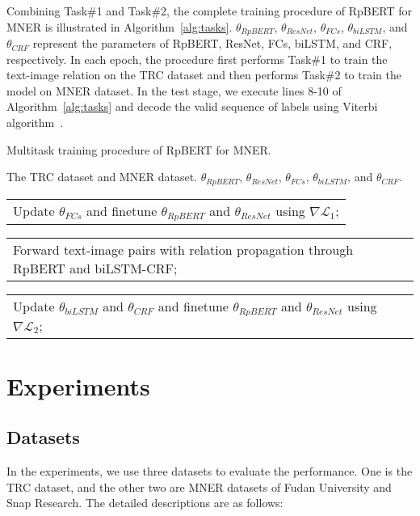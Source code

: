 \documentclass[letterpaper]{article} \usepackage{aaai21}  \usepackage{times}  \usepackage{helvet} \usepackage{courier}  \usepackage[hyphens]{url}  \usepackage{graphicx} \urlstyle{rm} \def\UrlFont{\rm}  \usepackage{natbib}  \usepackage{caption} \frenchspacing  \setlength{\pdfpagewidth}{8.5in}  \setlength{\pdfpageheight}{11in}
\makeatletter
\newcommand{\multiline}[1]{\begin{tabularx}{\dimexpr\linewidth-\ALG@thistlm}[t]{@{}X@{}}
    #1
  \end{tabularx}
}
\makeatother
\begin{document}
\smallskip

Combining Task\#1 and Task\#2, the complete training procedure of RpBERT for MNER is illustrated in Algorithm~\ref{alg:tasks}. 
$\theta_{RpBERT}$, $\theta_{ResNet}$, $\theta_{FCs}$, $\theta_{biLSTM}$, and $\theta_{CRF}$ represent the parameters of RpBERT, ResNet, FCs, biLSTM, and CRF, respectively. 
In each epoch, the procedure first performs Task\#1 to train the text-image relation on the TRC dataset
and then performs Task\#2 to train the model on MNER dataset.
In the test stage, we execute lines 8-10 of Algorithm~\ref{alg:tasks} and decode the valid  sequence of labels using Viterbi algorithm~\cite{lafferty2001conditional}.



\begin{algorithm}[tb]
\caption{Multitask training procedure of RpBERT for MNER.} \label{alg:tasks}
\begin{algorithmic}[1]
\Require The TRC dataset and MNER dataset.
\Ensure  $\theta_{RpBERT}$, $\theta_{ResNet}$, $\theta_{FCs}$, $\theta_{biLSTM}$, and $\theta_{CRF}$.
\State \multiline{Update $\theta_{FCs}$ and finetune  $\theta_{RpBERT}$ and $\theta_{ResNet}$ using $\nabla {\mathcal L}_{1}$;}
\EndFor
{}
\State \multiline{Forward text-image pairs with relation propagation through  RpBERT and biLSTM-CRF;}
\State \multiline{Update $\theta_{biLSTM}$ and $\theta_{CRF}$ and finetune $\theta_{RpBERT}$ and $\theta_{ResNet}$ using $\nabla {\mathcal L_2}$;}
\EndFor
\EndFor
\end{algorithmic}
\end{algorithm}

\section{Experiments}
\label{sec:length}

\subsection{Datasets}

In the experiments, we use three datasets to evaluate the performance. One is the TRC dataset, and the other two are  MNER  datasets of Fudan University and Snap Research. 
The detailed descriptions are as follows:
\end{document}
